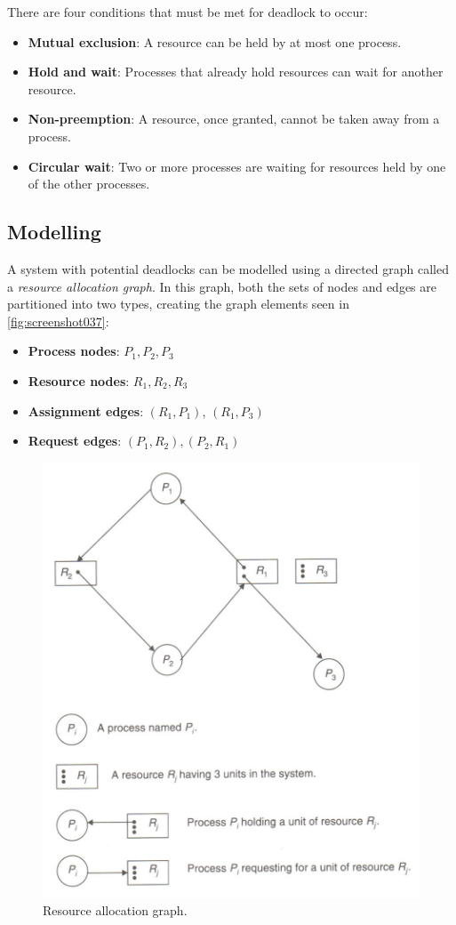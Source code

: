 There are four conditions that must be met for deadlock to occur:
\begin{itemize}
\item \textbf{Mutual exclusion}: A resource can be held by at most one process.
\item \textbf{Hold and wait}: Processes that already hold resources can wait for another resource. 
\item \textbf{Non-preemption}: A resource, once granted, cannot be taken away from a process. 
\item \textbf{Circular wait}: Two or more processes are waiting for resources held by one of the other processes. 
\end{itemize}

\subsection{Modelling}
A system with potential deadlocks can be modelled using a directed graph called a \textit{resource allocation graph}. In this graph, both the sets of nodes and edges are partitioned into two types, creating the graph elements seen in \autoref{fig:screenshot037}:
\begin{itemize}
\item \textbf{Process nodes}: $P_1, P_2, P_3$
\item \textbf{Resource nodes}: $R_1, R_2, R_3$
\item \textbf{Assignment edges}: $(R_1, P_1)$, $(R_1, P_3)$
\item \textbf{Request edges}: $(P_1, R_2), (P_2, R_1)$
\end{itemize}

\begin{figure}
\centering
\includegraphics[width=0.6\linewidth]{screenshot037}
\caption{Resource allocation graph.}
\label{fig:screenshot037}
\end{figure}

